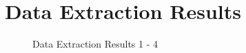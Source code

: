 \chapter{Data Extraction Results}


\begin{figure}[h]
    \centering
    \caption{Data Extraction Results 1 - 4}
    \label{fig:DataExtraction_1_to_4}
\end{figure}
 
